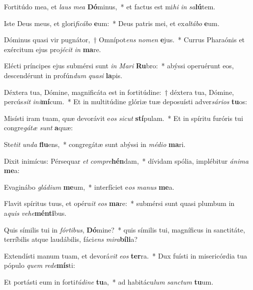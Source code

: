 \item Fortitúdo mea, et \textit{laus} \textit{me}\textit{a} \textbf{Dó}minus,~* et factus est mi\textit{hi} \textit{in} \textit{sa}\textbf{lú}tem.
\item Iste Deus meus, et glori\textit{fi}\textit{cá}\textit{bo} \textbf{e}um:~* Deus patris mei, et ex\textit{al}\textit{tá}\textit{bo} \textbf{e}um.
\item Dóminus quasi vir pugnátor,~† Omnípot\textit{ens} \textit{no}\textit{men} \textbf{e}jus.~* Currus Pharaónis et exércitum ejus pro\textit{jé}\textit{cit} \textit{in} \textbf{ma}re.
\item Elécti príncipes ejus submérsi sunt \textit{in} \textit{Ma}\textit{ri} \textbf{Ru}bro:~* abýssi operuérunt eos, descendérunt in profún\textit{dum} \textit{qua}\textit{si} \textbf{la}pis.
\item Déxtera tua, Dómine, magnificáta est in fortitúdine:~† déxtera tua, Dómine, percús\textit{sit} \textit{in}\textit{i}\textbf{mí}cum.~* Et in multitúdine glóriæ tuæ deposuísti adver\textit{sá}\textit{ri}\textit{os} \textbf{tu}os:
\item Misísti iram tuam, quæ devorávit e\textit{os} \textit{sic}\textit{ut} \textbf{stí}pulam.~* Et in spíritu furóris tui congre\textit{gá}\textit{tæ} \textit{sunt} \textbf{a}quæ:
\item Ste\textit{tit} \textit{un}\textit{da} \textbf{flu}ens,~* congregátæ sunt abýssi in \textit{mé}\textit{di}\textit{o} \textbf{ma}ri.
\item Dixit inimícus: Pérsequar \textit{et} \textit{com}\textit{pre}\textbf{hén}dam,~* dívidam spólia, implébitur \textit{á}\textit{ni}\textit{ma} \textbf{me}a:
\item Evaginábo \textit{glá}\textit{di}\textit{um} \textbf{me}um,~* interfíciet e\textit{os} \textit{ma}\textit{nus} \textbf{me}a.
\item Flavit spíritus tuus, et opéru\textit{it} \textit{e}\textit{os} \textbf{ma}re:~* submérsi sunt quasi plumbum in a\textit{quis} \textit{ve}\textit{he}\textbf{mén}\textbf{ti}bus.
\item Quis símilis tui in \textit{fór}\textit{ti}\textit{bus}, \textbf{Dó}mine?~* quis símilis tui, magníficus in sanctitáte, terríbilis atque laudábilis, fáci\textit{ens} \textit{mi}\textit{ra}\textbf{bí}\textbf{li}a?
\item Extendísti manum tuam, et devorá\textit{vit} \textit{e}\textit{os} \textbf{ter}ra.~* Dux fuísti in misericórdia tua pópulo \textit{quem} \textit{red}\textit{e}\textbf{mís}ti:
\item Et portásti eum in forti\textit{tú}\textit{di}\textit{ne} \textbf{tu}a,~* ad habitácu\textit{lum} \textit{sanc}\textit{tum} \textbf{tu}um.
